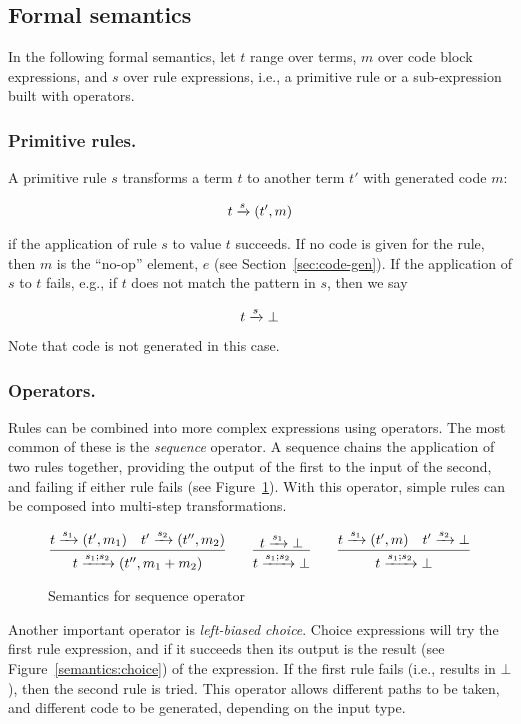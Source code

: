 \subsection{Formal semantics}

In the following formal semantics, let $t$ range over terms, $m$ over code block expressions, and $s$ over rule expressions, i.e., a primitive rule or a sub-expression built with operators.

\subsubsection{Primitive rules.}

A primitive rule $s$ transforms a term $t$ to another term $t'$ with generated code $m$:

\[
t \xrightarrow{s} (t',m)
\]

if the application of rule $s$ to value $t$ succeeds. If no code is given for the rule, then $m$ is the ``no-op'' element, $e$ (see Section~\ref{sec:code-gen}). If the application of $s$ to $t$ fails, e.g., if $t$ does not match the pattern in $s$, then we say

\[
t \xrightarrow{s} \bot
\]

Note that code is not generated in this case.

\subsubsection{Operators.}

Rules can be combined into more complex expressions using operators. The most common of these is the \emph{sequence} operator. A sequence chains the application of two rules together, providing the output of the first to the input of the second, and failing if either rule fails (see Figure~\ref{semantics:sequence}). With this operator, simple rules can be composed into multi-step transformations.

\begin{figure}[ht]
\[
\infer{t \arr{s_1;s_2} (t'',m_1+m_2)}{t \arr{s_1} (t',m_1) \quad t' \arr{s_2} (t'',m_2)}
\qquad 
\infer{t \arr{s_1;s_2} \bot}{t \arr{s_1} \bot}
\qquad
\infer{t \arr{s_1;s_2} \bot}{t \arr{s_1} (t',m) \quad t' \arr{s_2} \bot}
\]
\caption{Semantics for sequence operator}
\label{semantics:sequence}
\end{figure}

Another important operator is \emph{left-biased choice}. Choice expressions will try the first rule expression, and if it succeeds then its output is the result (see Figure~\ref{semantics:choice}) of the expression. If the first rule fails (i.e., results in $\bot$), then the second rule is tried. This operator allows different paths to be taken, and different code to be generated, depending on the input type.

